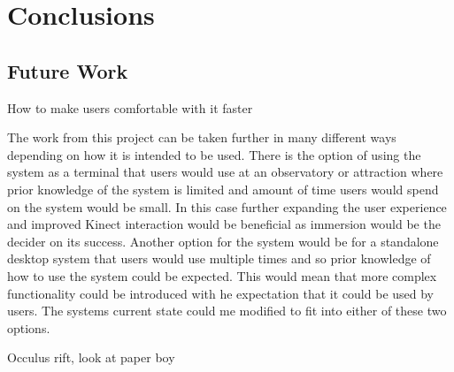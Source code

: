 \chapter{Conclusions}\label{C:con}
\section{Future Work}
How to make users comfortable with it faster





The work from this project can be taken further in many different ways depending
on how it is intended to be used. There is the option of using the system as a
terminal that users would use at an observatory or attraction where prior
knowledge of the system is limited and amount of time users would spend on the
system would be small. In this case further expanding the user experience and
improved Kinect interaction would be beneficial as immersion would be the
decider on its success. Another option for the system would be for a standalone
desktop system that users would use multiple times and so prior knowledge of how
to use the system could be expected. This would mean that more complex
functionality could be introduced with he expectation that it could be used by
users. The systems current state could me modified to fit into either of these
two options.

Occulus rift, look at paper boy~



